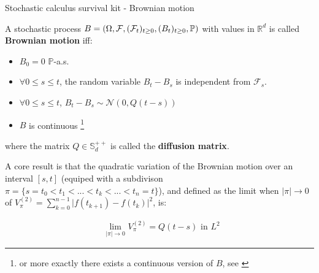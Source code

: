 \begin{frame}{Stochastic calculus survival kit - Brownian motion}
\begin{definition}
A stochastic process $B = (\Omega, \mathcal{F}, (\mathcal{F}_t)_{t \geq 0}, (B_t)_{t \geq 0}, \mathbb{P})$ with values in $\mathbb{R}^d$ is called \textbf{Brownian motion} iff:
\begin{itemize}
    \item $B_0 = 0$ $\mathbb{P}$-a.s.
    \item $\forall 0 \leq s \leq t$, the random variable $B_t-B_s$ is independent from $\mathcal{F}_s$.
    \item $\forall 0 \leq s \leq t$, $B_t - B_s \sim \mathcal{N}(0,Q(t-s))$
    \item $B$ is continuous \footnote{or more exactly there exists a continuous version of $B$, see \cite{mouvement-brownien-calcul-ito}}
\end{itemize}
where the matrix $Q \in \mathbb{S}^{++}_d$ is called the \textbf{diffusion matrix}.
\end{definition}


A core result is that the quadratic variation of the Brownian motion over an interval $[s,t]$ (equiped
with a subdivison $\pi = \{s=t_0 < t_1 < ...< t_k <... < t_n=t\}$), and defined as the limit when $\vert \pi \vert \rightarrow 0$ 
of $V_{\pi}^{(2)} = \sum_{k=0}^{n-1} \vert f(t_{k+1})-f(t_k)\vert^{2}$, is:

\begin{align}
    &\underset{\vert \pi \vert \rightarrow 0}{\text{lim}}\,\, V_{\pi}^{(2)} = Q(t-s) \,\, \text{in} \,\, L^{2}
\end{align}

\end{frame}



